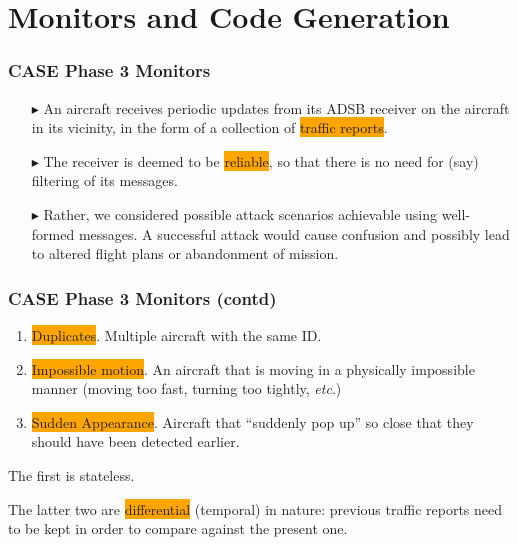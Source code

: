\documentclass{beamer}
\newcommand{\etc}{\textit{etc}}
\newcommand{\kemph}[1]{\colorbox{orange}{#1}}
\begin{document}
\section{Monitors and Code Generation}

\begin{frame}\frametitle{CASE Phase 3 Monitors}

\begin{itemize}
\item [$\blacktriangleright$]
  An aircraft receives periodic updates from its ADSB receiver on the
aircraft in its vicinity, in the form of a collection of \kemph{traffic reports}.

\item [$\blacktriangleright$]
  The receiver is deemed to be \kemph{reliable}, so that there is no
need for (say) filtering of its messages.

\item [$\blacktriangleright$]
  Rather, we considered possible attack scenarios achievable using
well-formed messages. A successful attack would cause confusion and
possibly lead to altered flight plans or abandonment of mission.
\end{itemize}

\end{frame}

\begin{frame}\frametitle{CASE Phase 3 Monitors (contd)}

\begin{enumerate}
\item \kemph{Duplicates}. Multiple aircraft with the same ID.

\item \kemph{Impossible motion}. An aircraft that is moving in a
  physically impossible manner (moving too fast, turning too tightly,
  \etc.)

\item \kemph{Sudden Appearance}. Aircraft that ``suddenly pop up'' so
  close that they should have been detected earlier.

\end{enumerate}

The first is stateless.

The latter two are \kemph{differential} (temporal) in nature: previous
traffic reports need to be kept in order to compare against the present one.

\end{frame}
\end{document}
